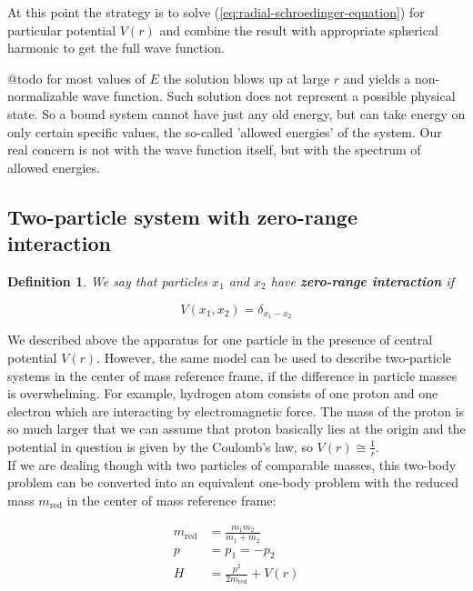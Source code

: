 \documentclass[11pt, a4paper, german]{article}
\newtheorem{definition}[theorem]{Definition}
\numberwithin{equation}{section}
\numberwithin{theorem}{section}
\begin{document}
At this point the strategy is to solve (\ref{eq:radial-schroedinger-equation}) for particular potential $V(r)$ and combine the result with appropriate spherical harmonic to get the full wave function.

@todo for most values of $E$ the solution blows up at large $r$ and yields a non-normalizable wave function. Such solution does not represent a possible physical state. So a bound system cannot have just any old energy, but can take energy on only certain specific values, the so-called 'allowed energies' of the system. Our real concern is not with the wave function itself, but with the spectrum of allowed energies.

\subsection{Two-particle system with zero-range interaction}

\begin{definition}
We say that particles $x_1$ and $x_2$ have \textbf{zero-range interaction} if 

\begin{equation}
V(x_1, x_2) = \delta_{x_1-x_2}
\end{equation}

\end{definition}

We described above the apparatus for one particle in the presence of central potential $V(r)$. However, the same model can be used to describe two-particle systems in the center of mass reference frame, if the difference in particle masses is overwhelming. For example, hydrogen atom consists of one proton and one electron which are interacting by electromagnetic force. The mass of the proton is so much larger that we can assume that proton basically lies at the origin and the potential in question is given by the Coulomb's law, so $V(r) \cong \frac 1r$.\\

If we are dealing though with two particles of comparable masses, this two-body problem can be converted into an equivalent one-body problem with the reduced mass $m_\text{red}$ in the center of mass reference frame:

\begin{align}
m_\text{red} &=\frac{m_1m_2}{m_1+m_2}\\
p&=p_1=-p_2\\
H &= \frac{p^2}{2m_\text{red}} + V(r)
\end{align}
\end{document}
